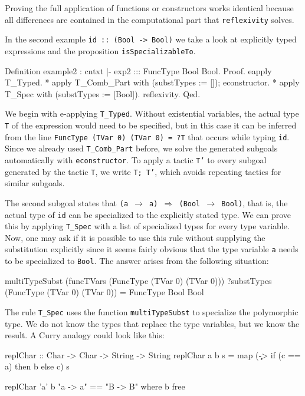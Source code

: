 \documentclass[paper = a4, fleqn, abstract=on, twoside]{scrreprt}
\begin{document}
\par
Proving the full application of functions or constructors works identical because all differences are contained in the computational part that \texttt{reflexivity} solves.\\
\par\noindent
In the second example \texttt{id :: (Bool -> Bool)} we take a look at explicitly typed expressions and the proposition \texttt{isSpecializableTo}. 
\begin{coqcode}
Definition example2 : cntxt |- exp2 ::: FuncType Bool Bool.
Proof.
  eapply T_Typed.
    * apply T_Comb_Part with (substTypes := []);
      econstructor.
    * apply T_Spec with (substTypes := [Bool]).
      reflexivity.
Qed.
\end{coqcode}
We begin with e-applying \texttt{T\_Typed}. Without existential variables, the actual type \texttt{T} of the expression would need to be specified, but in this case it can be inferred from the line \texttt{FuncType (TVar 0) (TVar 0) = ?T} that occurs while typing \texttt{id}. Since we already used \texttt{T\_Comb\_Part} before, we solve the generated subgoals automatically with \texttt{econstructor}. To apply a tactic \texttt{T'} to every subgoal generated by the tactic \texttt{T}, we write \texttt{T; T'}, which avoids repeating tactics for similar subgoals. 
\par
The second subgoal states that \texttt{(a $\rightarrow$ a) $\Rightarrow$ (Bool $\rightarrow$ Bool)}, that is, the actual type of \texttt{id} can be specialized to the explicitly stated type. We can prove this by applying \texttt{T\_Spec} with a list of specialized types for every type variable. Now, one may ask if it is possible to use this rule without supplying the substitution explicitly since it seems fairly obvious that the type variable \texttt{a} needs to be specialized to \texttt{Bool}. The answer arises from the following situation:
\begin{coqcode}
multiTypeSubst (funcTVars (FuncType (TVar 0) (TVar 0))) ?substTypes
(FuncType (TVar 0) (TVar 0)) = FuncType Bool Bool
\end{coqcode}
The rule \texttt{T\_Spec} uses the function \texttt{multiTypeSubst} to specialize the polymorphic type. We do not know the types that replace the type variables, but we know the result. A Curry analogy could look like this:
\begin{haskellcode}
replChar :: Char -> Char -> String -> String
replChar a b s = map (\c -> if (c == a) then b else c) s

replChar 'a' b "a -> a" == "B -> B" where b free
\end{haskellcode}
\end{document}
